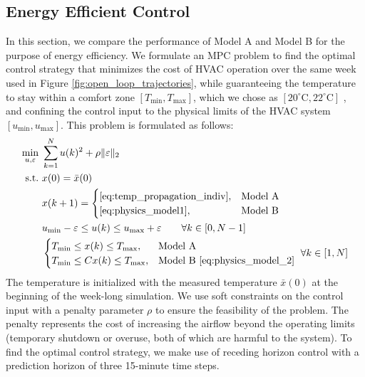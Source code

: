 \subsection{Energy Efficient Control}\label{sec:energy_efficient_control}
In this section, we compare the performance of Model A and Model B for the purpose of energy efficiency. We formulate an MPC problem to find the optimal control strategy that minimizes the cost of HVAC operation over the same week used in Figure \ref{fig:open_loop_trajectories}, while guaranteeing the temperature to stay within a comfort zone $[T_{\text{min}}, T_{\text{max}}]$, which we chose as $[20^\circ \text{C}, 22^\circ \text{C}]$ \cite{Hansen:2013aa}, and confining the control input to the physical limits of the HVAC system $[u_{\text{min}}, u_{\text{max}}]$. This problem is formulated as follows:
\begin{equation}\label{eq:ee_controller}
\begin{split}
\min_{u, \varepsilon}~&\sum_{k=1}^N u(k)^2 + \rho \Vert\varepsilon\Vert_2 \\
\text{s.t.}~& x(0) = \bar{x}(0) \\
& x(k+1) = \begin{cases}
      \eqref{eq:temp_propagation_indiv}, & \text{Model A}  \\
      \eqref{eq:physics_model1}, & \text{Model B}
    \end{cases} \\
& u_{\text{min}}-\varepsilon \leq u(k) \leq u_{\text{max}}+\varepsilon\qquad \forall k\in[0, N-1]\\
& \begin{cases}
      T_{\text{min}} \leq x(k) \leq T_{\text{max}}, & \text{Model A}  \\
      T_{\text{min}} \leq Cx(k) \leq T_{\text{max}}, & \text{Model B}~\eqref{eq:physics_model_2}
    \end{cases}~ \forall k\in[1, N]
\end{split}
\end{equation}
The temperature is initialized with the measured temperature $\bar{x}(0)$ at the beginning of the week-long simulation. We use soft constraints on the control input with a penalty parameter $\rho$ to ensure the feasibility of the problem. The penalty represents the cost of increasing the airflow beyond the operating limits (temporary shutdown or overuse, both of which are harmful to the system). 
To find the optimal control strategy, we make use of receding horizon control with a prediction horizon of three 15-minute time steps.



